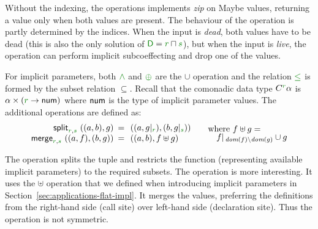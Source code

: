 \noindent
Without the indexing, the  operations implements \emph{zip} on Maybe values,
returning a value only when both values are present. The behaviour of the 
operation is partly determined by the indices. When the input is \emph{dead}, both values have
to be dead (this is also the only solution of $\cclrd{\ident{D}} =\cclrd{r}\sqcap\cclrd{s}$), but when
the input is \emph{live}, the operation can perform implicit subcoeffecting and drop one of
the values.

\begin{example}
\label{thm:semantics-indexed-prod}

For implicit parameters, both $\czip$ and $\cpar$ are the $\cup$ operation and the relation
$\cleq$ is formed by the subset relation $\subseteq$. Recall that the comonadic data type $\ctyp{\cclrd{r}}{\alpha}$
is $\alpha \times (\cclrd{r} \rightarrow \ident{num})$ where $\textnormal{\sffamily num}$ is the type of implicit parameter values.
The additional operations are defined as:
%
\begin{equation*}
\begin{array}{rcl}
\ident{split}_{\cclrd{r}, \cclrd{s}}~((a,b), g) &\narrow{=}& ((a, \restr{g}{\cclrd{r}}), (b, \restr{g}{\cclrd{s}}))\\
\ident{merge}_{\cclrd{r}, \cclrd{s}}~((a, f), (b, g)) &\narrow{=}& ((a, b), f \uplus g)\\
\end{array}
\quad
\begin{array}{l}
\textnormal{where}~f \uplus g = \\[-0.25em]
\quad\restr{f}{\, \textit{dom}(f) \setminus \textit{dom}(g)} \cup g
\end{array}
\end{equation*}
\end{example}

\noindent
The  operation splits the tuple and restricts the function (representing available
implicit parameters) to the required subsets. The  operation is more
interesting. It uses the $\uplus$ operation that we defined when introducing implicit parameters
in Section~\ref{sec:applications-flat-impl}. It merges the values, preferring the definitions from
the right-hand side (call site) over left-hand side (declaration site). Thus the operation is not
symmetric.

